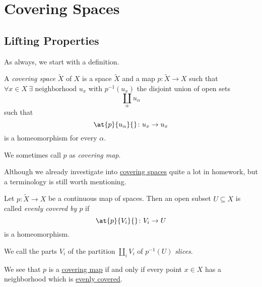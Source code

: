 \section{Covering Spaces}
\subsection{Lifting Properties}
As always, we start with a definition.
\begin{definition}\label{def:covering-space}\label{def:covering-map}
	A \emph{covering space} \(\widetilde{X} \) of \(X\) is a space \(\widetilde{X} \) and a map \(p\colon \widetilde{X} \to X\)
	such that \(\forall x\in X\ \exists \text{ neighborhood } u_{x}\) with \(p^{-1} (u_{x})\) the disjoint union of open sets
	\[
		\coprod_\alpha u_\alpha
	\]
	such that
	\[
		\at{p}{u_\alpha }{} \colon u_{x}\to u_{x}
	\]
	is a homeomorphism for every \(\alpha \).
	\begin{figure}[H]
		\centering
		\label{fig:def:covering-space}
	\end{figure}
	We sometimes call \(p\) as \emph{covering map}.
\end{definition}

Although we already investigate into \hyperref[def:covering-space]{covering spaces} quite a lot in homework, but a terminology is still
worth mentioning.
\begin{definition}\label{def:evenly-covered}
	Let \(p\colon \widetilde{X} \to X\) be a continuous map of spaces. Then an open subset \(U\subseteq X\) is called \emph{evenly covered by \(p\) }
	if
	\[
		\at{p}{V_{i}}{} \colon V_{i}\to U
	\]
	is a homeomorphism.

	\par We call the parts \(V_{i}\) of the partition \(\coprod_i V_{i}\) of \(p^{-1} (U)\) \emph{slices}.
\end{definition}
\begin{remark}
	We see that \(p\) is a \hyperref[def:covering-map]{covering map} if and only if every point \(x\in X\) has a neighborhood which is
	\hyperref[def:evenly-covered]{evenly covered}.
\end{remark}

